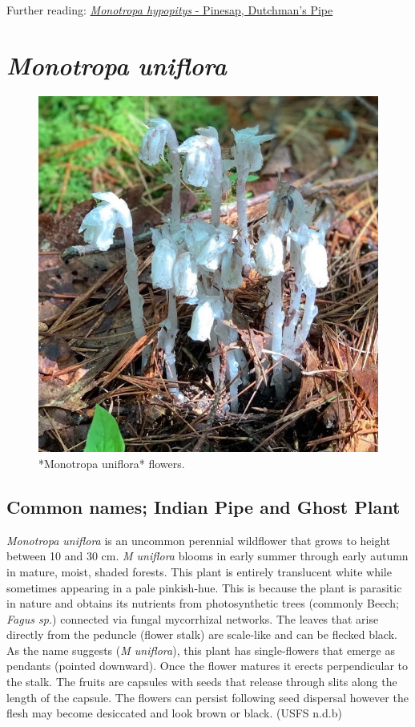 \documentclass[
]{article}
\begin{document}
Further reading: \href{https://www.fs.fed.us/wildflowers/beauty/mycotrophic/monotropa_hypopitys.shtml}{\emph{Monotropa hypopitys} - Pinesap, Dutchman's Pipe}

\hypertarget{monotropa-uniflora}{%
\section{\texorpdfstring{\emph{Monotropa uniflora}}{Monotropa uniflora}}\label{monotropa-uniflora}}

\begin{figure}

{\centering \includegraphics[width=0.5\linewidth]{M uniflora} 

}

\caption{*Monotropa uniflora* flowers.}\label{fig:uniflora}
\end{figure}

\hypertarget{common-names-indian-pipe-and-ghost-plant}{%
\subsection{Common names; Indian Pipe and Ghost Plant}\label{common-names-indian-pipe-and-ghost-plant}}

\emph{Monotropa uniflora} is an uncommon perennial wildflower that grows to height between 10 and 30 cm. \emph{M uniflora} blooms in early summer through early autumn in mature, moist, shaded forests. This plant is entirely translucent white while sometimes appearing in a pale pinkish-hue. This is because the plant is parasitic in nature and obtains its nutrients from photosynthetic trees (commonly Beech; \emph{Fagus sp.}) connected via fungal mycorrhizal networks. The leaves that arise directly from the peduncle (flower stalk) are scale-like and can be flecked black. As the name suggests (\emph{M uniflora}), this plant has single-flowers that emerge as pendants (pointed downward). Once the flower matures it erects perpendicular to the stalk. The fruits are capsules with seeds that release through slits along the length of the capsule. The flowers can persist following seed dispersal however the flesh may become desiccated and look brown or black. (USFS n.d.b)
\end{document}
